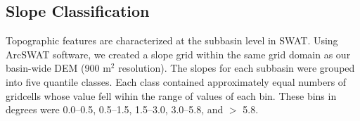 \subsection{Slope Classification}\label{sec:slope}

Topographic features are characterized at the subbasin level in SWAT. Using ArcSWAT software, we created a slope grid within the same grid domain as our basin-wide DEM (900 m$^2$ resolution). The slopes for each subbasin were grouped into five quantile classes. Each class contained approximately equal numbers of gridcells whose value fell wihin the range of values of each bin. These bins in degrees were 0.0--0.5, 0.5--1.5, 1.5--3.0, 3.0--5.8, and $>$ 5.8.
